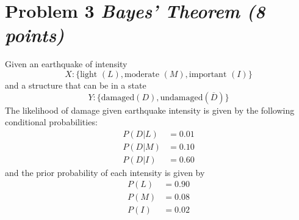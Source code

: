 \documentclass[11pt,twoside]{article}
\newcommand{\pts}[1]{\marginpar{ \small\hspace{0pt} \textit{[#1]} } }
\numberwithin{equation}{section}
\newcommand{\?}{\stackrel{?}{=}}
\newcommand{\fr}{\frac}
\newcommand{\ol}{\overline}
\begin{document}
  
  


\eject

\section*{Problem 3 \textit{Bayes' Theorem (8 points)}}
Given an earthquake of intensity
\begin{equation}
  \label{eq:10}
  X :  \{\text{light } (L), \text{moderate } (M), \text{important } (I)\}
\end{equation}
and a structure that can be in a state
\begin{equation}
  \label{eq:11}
  Y :   \{\text{damaged} (D), \text{undamaged} (\ol{D})\}
\end{equation}
The likelihood of damage given earthquake intensity is given by the following conditional probabilities:
\begin{align*}
  \label{eq:12}
  P(D|L) &= 0.01 \\
  P(D|M) &= 0.10 \\
  P(D|I) &= 0.60 
  \end{align*}
and the prior probability of each intensity is given by
\begin{align*}
    P(L) &= 0.90 \\
    P(M) &= 0.08 \\
    P(I) &= 0.02 
\end{align*}
\end{document}
